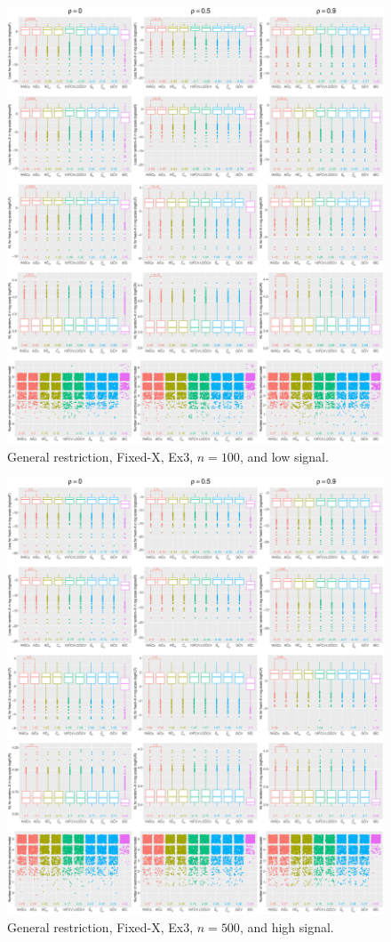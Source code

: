 \begin{figure}[!ht]
\centering
\includegraphics[width=\textwidth]{figures/supplement/fixedx/general_restriction/Ex3_n100_lsnr.eps}
\caption{General restriction, Fixed-X, Ex3, $n=100$, and low signal.}
\end{figure}
\clearpage
\begin{figure}[!ht]
\centering
\includegraphics[width=\textwidth]{figures/supplement/fixedx/general_restriction/Ex3_n500_hsnr.eps}
\caption{General restriction, Fixed-X, Ex3, $n=500$, and high signal.}
\end{figure}
